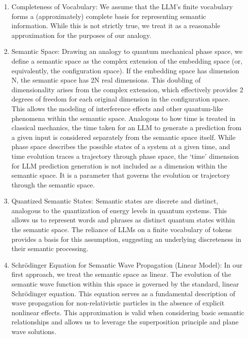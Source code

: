 \documentclass[prd,amsmath,amssymb,12pt]{revtex4}
\begin{document}
\begin{enumerate}
    \item Completeness of Vocabulary: We assume that the LLM's finite vocabulary forms a (approximately) complete basis
    for representing semantic information.  While this is not strictly true, we treat it as a reasonable approximation
    for the purposes of our analogy.

    \item Semantic Space: Drawing an analogy to quantum mechanical phase space, we define a semantic space
    as the complex extension of the embedding space (or, equivalently, the configuration space).
    If the embedding space has dimension N, the semantic space has 2N real dimensions. This doubling
    of dimensionality arises from the complex extension, which effectively provides 2 degrees of
    freedom for each original dimension in the configuration space. This allows the modeling of
    interference effects and other quantum-like phenomena within the semantic space. Analogous
    to how time is treated in classical mechanics, the time taken for an LLM to generate a
    prediction from a given input is considered separately from the semantic space itself.
    While phase space describes the possible states of a system at a given time, and time
    evolution traces a trajectory through phase space, the `time' dimension for LLM prediction
    generation is not included as a dimension within the semantic space. It is a parameter that
    governs the evolution or trajectory through the semantic space.

    \item Quantized Semantic States: Semantic states are discrete and distinct, analogous to the quantization of energy
    levels in quantum systems. This allows us to represent words and phrases as distinct quantum states within the
    semantic space.
    The reliance of LLMs on a finite vocabulary of tokens provides a basis for this assumption, suggesting an underlying
    discreteness in their semantic processing.

    \item Schrödinger Equation for Semantic Wave Propagation (Linear Model): In our first approach, we treat the semantic
    space as linear. The evolution of the semantic wave function within this space is governed by the standard,
    linear Schrödinger equation. This equation serves as a fundamental description of wave propagation for non-relativistic
    particles in the absence of explicit nonlinear effects. This approximation is valid when considering basic
    semantic relationships and allows us to leverage the superposition principle and plane wave solutions.


\end{enumerate}
\end{document}
